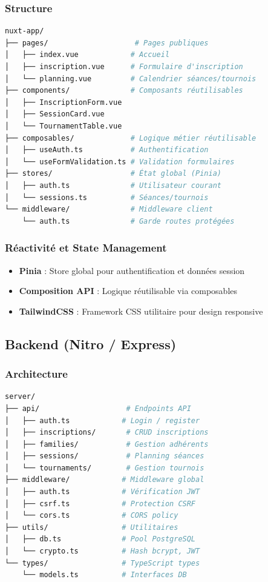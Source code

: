 \documentclass[11pt,a4paper]{article}
\begin{document}
\subsubsection{Structure}
\begin{lstlisting}[language=bash]
nuxt-app/
├── pages/                    # Pages publiques
│   ├── index.vue            # Accueil
│   ├── inscription.vue      # Formulaire d'inscription
│   └── planning.vue         # Calendrier séances/tournois
├── components/              # Composants réutilisables
│   ├── InscriptionForm.vue
│   ├── SessionCard.vue
│   └── TournamentTable.vue
├── composables/             # Logique métier réutilisable
│   ├── useAuth.ts           # Authentification
│   └── useFormValidation.ts # Validation formulaires
├── stores/                  # État global (Pinia)
│   ├── auth.ts              # Utilisateur courant
│   └── sessions.ts          # Séances/tournois
└── middleware/              # Middleware client
    └── auth.ts              # Garde routes protégées
\end{lstlisting}

\subsubsection{Réactivité et State Management}
\begin{itemize}
  \item \textbf{Pinia} : Store global pour authentification et données session
  \item \textbf{Composition API} : Logique réutilisable via composables
  \item \textbf{TailwindCSS} : Framework CSS utilitaire pour design responsive
\end{itemize}

\subsection{Backend (Nitro / Express)}

\subsubsection{Architecture}
\begin{lstlisting}[language=bash]
server/
├── api/                    # Endpoints API
│   ├── auth.ts            # Login / register
│   ├── inscriptions/       # CRUD inscriptions
│   ├── families/           # Gestion adhérents
│   ├── sessions/           # Planning séances
│   └── tournaments/        # Gestion tournois
├── middleware/            # Middleware global
│   ├── auth.ts            # Vérification JWT
│   ├── csrf.ts            # Protection CSRF
│   └── cors.ts            # CORS policy
├── utils/                 # Utilitaires
│   ├── db.ts              # Pool PostgreSQL
│   └── crypto.ts          # Hash bcrypt, JWT
└── types/                 # TypeScript types
    └── models.ts          # Interfaces DB
\end{lstlisting}
\end{document}

